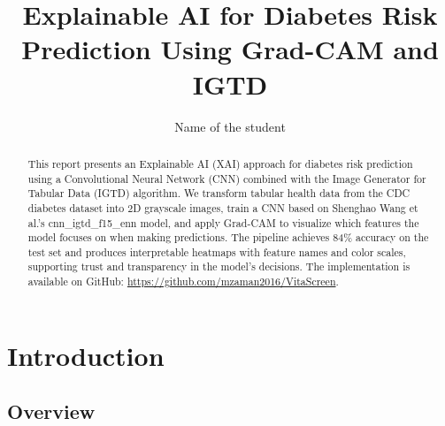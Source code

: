 \documentclass[12pt]{dalthesis}
\begin{document}
\title{Explainable AI for Diabetes Risk Prediction Using Grad-CAM and IGTD}
\author{Name of the student}

\macs  
{}


\makenomenclature
\renewcommand{\nomname}{List of Abbreviations and Symbols Used}


\frontmatter

\begin{abstract}
This report presents an Explainable AI (XAI) approach for diabetes risk prediction using a Convolutional Neural Network (CNN) combined with the Image Generator for Tabular Data (IGTD) algorithm. We transform tabular health data from the CDC diabetes dataset into 2D grayscale images, train a CNN based on Shenghao Wang et al.'s cnn\_igtd\_f15\_enn model, and apply Grad-CAM to visualize which features the model focuses on when making predictions. The pipeline achieves 84\% accuracy on the test set and produces interpretable heatmaps with feature names and color scales, supporting trust and transparency in the model's decisions. The implementation is available on GitHub: \url{https://github.com/mzaman2016/VitaScreen}.
\end{abstract}

\printnomenclature

\begin{acknowledgements}
\end{acknowledgements}

\mainmatter

\chapter{Introduction}
\section{Overview}
\end{document}
